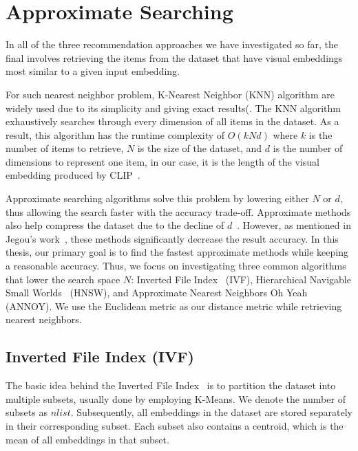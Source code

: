 \section{Approximate Searching}
In all of the three recommendation approaches we have investigated so far, the final involves retrieving the items from the dataset that have visual embeddings most similar to a given input embedding.

For such nearest neighbor problem, K-Nearest Neighbor (KNN) algorithm are widely used due to its simplicity and giving exact results(\cite{Lin-CVPR2020-Fashion, Baldrati-CVPR2022-Conditioned, Baldrati-CVPR2022-Effective, Sarkar-CVPRW2022-OutfitTransformer}.  The KNN algorithm exhaustively searches through every dimension of all items in the dataset. As a result, this algorithm has the runtime complexity of $O(kNd)$ where $k$ is the number of items to retrieve, $N$ is the size of the dataset, and $d$ is the number of dimensions to represent one item, in our case, it is the length of the visual embedding produced by CLIP~\cite{Radford-OpenAIblog2019-Language}. 

Approximate searching algorithms solve this problem by lowering either $N$ or $d$, thus allowing the search faster with the accuracy trade-off. Approximate methods also help compress the dataset due to the decline of $d$~\cite{Gionis-VLDB1999-Similarity, Jegou-TPAMI2010-Product}. However, as mentioned in Jegou's work~\cite{Jegou-ICASSP2011-IVFPQ}, these methods significantly decrease the result accuracy.  In this thesis, our primary goal is to find the fastest approximate methods while keeping a reasonable accuracy. Thus, we focus on investigating three common algorithms that lower the search space $N$: Inverted File Index~\cite{Sivic-ICCV2003-Video} (IVF), Hierarchical Navigable Small Worlds~\cite{Malkov-TPAMI2018-Efficient} (HNSW), and Approximate Nearest Neighbors Oh Yeah~\cite{Erik-Github-Annoy} (ANNOY). We use the Euclidean metric as our distance metric while retrieving nearest neighbors.

\subsection{Inverted File Index (IVF)}
The basic idea behind the Inverted File Index~\cite{Sivic-ICCV2003-Video} is to partition the dataset into multiple subsets, usually done by employing K-Means. We denote the number of subsets as $nlist$. Subsequently, all embeddings in the dataset are stored separately in their corresponding subset. Each subset also contains a centroid, which is the mean of all embeddings in that subset. 


